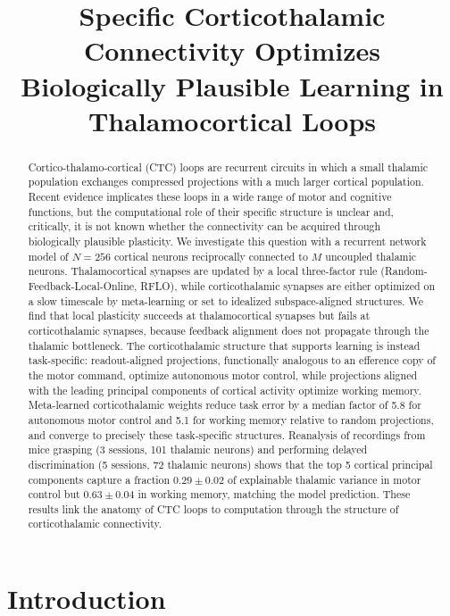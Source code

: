 \documentclass[11pt]{article}
\title{Specific Corticothalamic Connectivity Optimizes Biologically
Plausible Learning in Thalamocortical Loops}
\date{}
\begin{document}
\maketitle

\begin{abstract}
Cortico-thalamo-cortical (CTC) loops are recurrent circuits in which a
small thalamic population exchanges compressed projections with a much
larger cortical population. Recent evidence implicates these loops in a
wide range of motor and cognitive functions, but the computational role
of their specific structure is unclear and, critically, it is not known
whether the connectivity can be acquired through biologically plausible
plasticity. We investigate this question with a recurrent network model
of $N = 256$ cortical neurons reciprocally connected to $M$ uncoupled
thalamic neurons. Thalamocortical synapses are updated by a local
three-factor rule (Random-Feedback-Local-Online, RFLO), while
corticothalamic synapses are either optimized on a slow timescale by
meta-learning or set to idealized subspace-aligned structures. We find
that local plasticity succeeds at thalamocortical synapses but fails at
corticothalamic synapses, because feedback alignment does not propagate
through the thalamic bottleneck. The corticothalamic structure that
supports learning is instead task-specific: readout-aligned
projections, functionally analogous to an efference copy of the motor
command, optimize autonomous motor control, while projections aligned
with the leading principal components of cortical activity optimize
working memory. Meta-learned corticothalamic weights reduce task
error by a median factor of 5.8 for autonomous motor control and 5.1
for working memory relative to random projections, and converge to
precisely these task-specific structures. Reanalysis of recordings from mice grasping (3 sessions, 101
thalamic neurons) and performing delayed discrimination (5 sessions,
72 thalamic neurons) shows that the top 5 cortical principal
components capture a fraction $0.29 \pm 0.02$ of explainable thalamic
variance in motor control but $0.63 \pm 0.04$ in working memory,
matching the model prediction. These results link the anatomy of CTC
loops to computation through the structure of corticothalamic
connectivity.
\end{abstract}

\section{Introduction}
\end{document}

